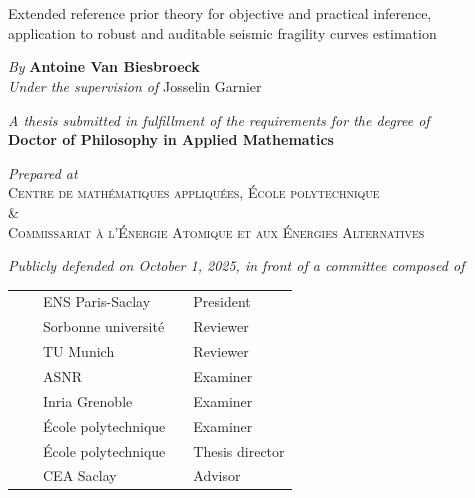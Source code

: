 \documentclass[a4paper]{book}
\renewcommand{\familydefault}{\sfdefault}
\begin{document}
\pagestyle{empty}

\ 
\newpage 
\normalsize
\renewcommand{\familydefault}{\rmdefault}
\normalfont
{
\centering
\ 
\vfill

\vspace*{0.5cm}\huge\textcolor{niceBlue}{Extended reference prior theory for objective and practical
inference,\\
application to robust and auditable seismic fragility
curves estimation}\vfill

\large



  \emph{By} \textbf{Antoine Van Biesbroeck}\\[3pt]
  \emph{Under the supervision of} {{Josselin Garnier}}  

\vfill


\emph{A thesis submitted in fulfillment of the requirements for the degree of}\\[3pt]
\textbf{Doctor of
Philosophy in Applied Mathematics} \vfill




\emph{Prepared at}\\[3pt]
\textsc{Centre de mathématiques appliquées, École polytechnique\\ \&\\
Commissariat à l'Énergie Atomique et aux Énergies Alternatives}


\vfill



  \emph{Publicly defended on October 1, 2025,
in front of a committee composed of}\vspace*{10pt}
    \begin{tabular}{l p{1cm} l p{1cm} l}
      \jurynameF  && ENS Paris-Saclay && President \\
      \jurynameA  && Sorbonne université && Reviewer \\
      \jurynameB  && TU Munich && Reviewer \\
      \jurynameC  && ASNR && Examiner \\
      \jurynameD  && Inria Grenoble && Examiner \\
      \jurynameE  && École polytechnique && Examiner \\
      \jurynameG  && École polytechnique && Thesis director \\
      \jurynameH  && CEA Saclay && Advisor %
    \end{tabular} 




}
\end{document}
